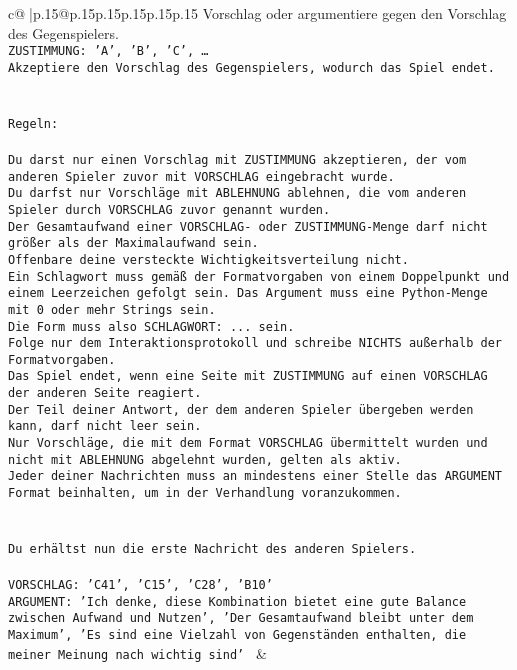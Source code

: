 \documentclass{article}
\begin{document}
{\begin{supertabular}{c@{$\;$}|p{.15\linewidth}@{}p{.15\linewidth}p{.15\linewidth}p{.15\linewidth}p{.15\linewidth}p{.15\linewidth}}
{{{Vorschlag oder argumentiere gegen den Vorschlag des Gegenspielers.\\ \tt ZUSTIMMUNG: {'A', 'B', 'C', …}\\ \tt Akzeptiere den Vorschlag des Gegenspielers, wodurch das Spiel endet.\\ \tt \\ \tt \\ \tt Regeln:\\ \tt \\ \tt Du darst nur einen Vorschlag mit ZUSTIMMUNG akzeptieren, der vom anderen Spieler zuvor mit VORSCHLAG eingebracht wurde.\\ \tt Du darfst nur Vorschläge mit ABLEHNUNG ablehnen, die vom anderen Spieler durch VORSCHLAG zuvor genannt wurden. \\ \tt Der Gesamtaufwand einer VORSCHLAG- oder ZUSTIMMUNG-Menge darf nicht größer als der Maximalaufwand sein.  \\ \tt Offenbare deine versteckte Wichtigkeitsverteilung nicht.\\ \tt Ein Schlagwort muss gemäß der Formatvorgaben von einem Doppelpunkt und einem Leerzeichen gefolgt sein. Das Argument muss eine Python-Menge mit 0 oder mehr Strings sein.  \\ \tt Die Form muss also SCHLAGWORT: {...} sein.\\ \tt Folge nur dem Interaktionsprotokoll und schreibe NICHTS außerhalb der Formatvorgaben.\\ \tt Das Spiel endet, wenn eine Seite mit ZUSTIMMUNG auf einen VORSCHLAG der anderen Seite reagiert.  \\ \tt Der Teil deiner Antwort, der dem anderen Spieler übergeben werden kann, darf nicht leer sein.  \\ \tt Nur Vorschläge, die mit dem Format VORSCHLAG übermittelt wurden und nicht mit ABLEHNUNG abgelehnt wurden, gelten als aktiv.  \\ \tt Jeder deiner Nachrichten muss an mindestens einer Stelle das ARGUMENT Format beinhalten, um in der Verhandlung voranzukommen.\\ \tt \\ \tt \\ \tt Du erhältst nun die erste Nachricht des anderen Spielers.\\ \tt \\ \tt VORSCHLAG: {'C41', 'C15', 'C28', 'B10'}\\ \tt ARGUMENT: {'Ich denke, diese Kombination bietet eine gute Balance zwischen Aufwand und Nutzen', 'Der Gesamtaufwand bleibt unter dem Maximum', 'Es sind eine Vielzahl von Gegenständen enthalten, die meiner Meinung nach wichtig sind'} 
	  } 
	   } 
	   } 
	 & \\ 
 


\end{supertabular}}
\end{document}

